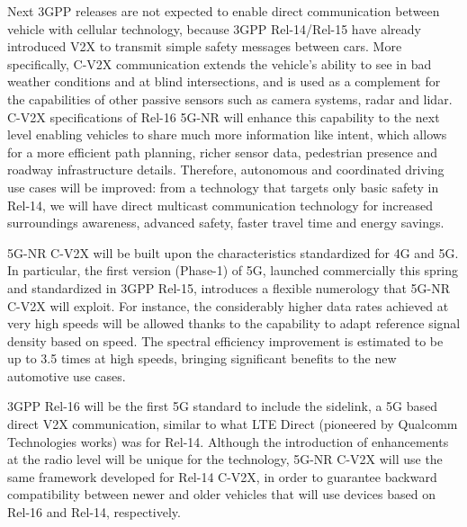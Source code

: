 \documentclass[conference,12pt,onecolumn]{IEEEtran}
\begin{document}
Next 3GPP releases are not expected to enable direct communication between vehicle with cellular technology, because 3GPP Rel-14/Rel-15 have already introduced V2X to transmit simple safety messages between cars. More specifically, C-V2X communication extends the vehicle's ability to see in bad weather conditions and at blind intersections, and is used as a complement for the capabilities of other passive sensors such as camera systems, radar and lidar. C-V2X specifications of Rel-16 5G-NR will enhance this capability to the next level enabling vehicles to share much more information like intent, which allows for a more efficient path planning, richer sensor data, pedestrian presence and roadway infrastructure details. Therefore, autonomous and coordinated driving use cases will be improved: from a technology that targets only basic safety in Rel-14, we will have direct multicast communication technology for increased surroundings awareness, advanced safety, faster travel time and energy savings. 

5G-NR C-V2X will be built upon the characteristics standardized for 4G and 5G. In particular, the first version (Phase-1) of 5G, launched commercially this spring and standardized in 3GPP Rel-15, introduces a flexible numerology that 5G-NR C-V2X will exploit. For instance, the considerably higher data rates achieved at very high speeds will be allowed thanks to the capability to adapt reference signal density based on speed. The spectral efficiency improvement is estimated to be up to 3.5 times at high speeds, bringing significant benefits to the new automotive use cases.

3GPP Rel-16 will be the first 5G standard to include the sidelink, a 5G based direct V2X communication, similar to what LTE Direct (pioneered by Qualcomm Technologies works) was for Rel-14. Although the introduction of enhancements at the radio level will be unique for the technology, 5G-NR C-V2X  will use the same framework developed for Rel-14 C-V2X, in order to guarantee backward compatibility between newer and older vehicles that will use devices based on Rel-16 and Rel-14, respectively.
\end{document}
